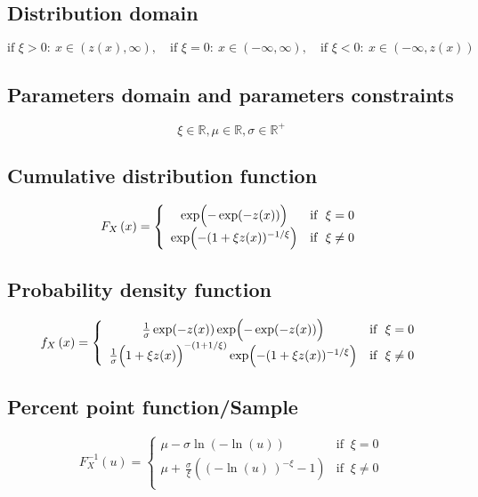 \documentclass{article}
\begin{document}
\subsection{Distribution domain}
\begin{equation*} \text{if }\xi>0:\ x\in\left(z(x),\infty\right),\quad \text{if }\xi=0:\ x\in\left(-\infty,\infty\right),\quad \text{if }\xi<0:\ x\in\left(-\infty,z(x)\right) \end{equation*}
\subsection{Parameters domain and parameters constraints}
\begin{equation*} \xi\in\mathbb{R}, \mu\in\mathbb{R}, \sigma\in\mathbb{R}^{+} \end{equation*}
\subsection{Cumulative distribution function}
\begin{equation*} F_{X}\left(x\right)=\left\{\begin{array}{cl} \exp\Bigl(-\exp(-z(x))\Bigr) & \text{if } ~ \xi=0 \\ \exp\Bigl(-(1+\xi z(x))^{-1/\xi}\Bigr) & \text{if } ~ \xi \neq 0\end{array} \right. \end{equation*}
\subsection{Probability density function}
\begin{equation*} f_{X}\left(x\right)=\left\{\begin{array}{cl}\frac{1}{\sigma}\exp(-z(x)) \exp\Bigl(-\exp(-z(x))\Bigr) & \text{if } ~ \xi=0 \\ \frac{1}{\sigma}\Bigl(1+\xi z(x)\Bigr)^{-(1+1/\xi)} \exp\Bigl(-(1+\xi z(x))^{-1/\xi}\Bigr) & \text{if } ~ \xi \neq 0\end{array} \right. \end{equation*}
\subsection{Percent point function/Sample}
\begin{equation*} F^{-1}_{X}\left(u\right)=\left\{\begin{array}{cl} \mu-\sigma\ln\left(-\ln\left(u\right)\right) & \text{if } ~ \xi=0 \\ \mu+\frac{}{}\frac{\sigma}{\xi}\left(\left(-\ln(u)\,\right)^{-\xi}-1\right) & \text{if } ~ \xi \neq 0\\ \end{array} \right. \end{equation*}
\end{document}
